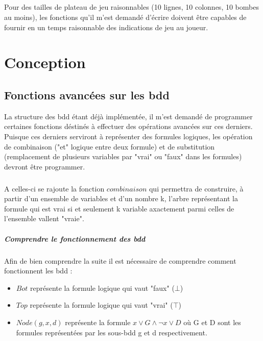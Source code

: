 \documentclass{report}
\begin{document}
\paragraph{}
Pour des tailles de plateau de jeu raisonnables (10 lignes, 10 colonnes, 10 bombes au moins), les fonctions qu'il m'est demandé d'écrire doivent être capables de fournir en un temps raisonnable des indications de jeu au joueur.

 
\chapter{Conception}

\section{Fonctions avancées sur les bdd}
	La structure des bdd étant déjà implémentée, il m'est demandé de programmer certaines fonctions déstinés à effectuer des opérations avancées sur ces derniers.
	Puisque ces derniers serviront à représenter des formules logiques, les opération de combinaison ("et" logique entre deux formule) et de substitution (remplacement de plusieurs variables par "vrai" ou "faux" dans les formules) devront être programmer.
	\paragraph{}
	A celles-ci se rajoute la fonction $combinaison$ qui permettra de construire, à partir d'un ensemble de variables et d'un nombre k, l'arbre représentant la formule qui est vrai si et seulement k variable axactement parmi celles de l'ensemble vallent "vraie".
	\paragraph{Comprendre le fonctionnement des bdd}
	Afin de bien comprendre la suite il est nécessaire de comprendre comment fonctionnent les bdd :
	
	\begin{itemize}
		\item $Bot$ représente la formule logique qui vaut "faux" ($\bot$)
		\item $Top$ représente la formule logique qui vaut "vrai" ($\top$)
		\item $Node(g, x, d)$ représente la formule $x \vee G \wedge \neg x \vee D$ où G et D sont les formules représentées par les sous-bdd g et d respectivement.
	\end{itemize}
 
\end{document}
